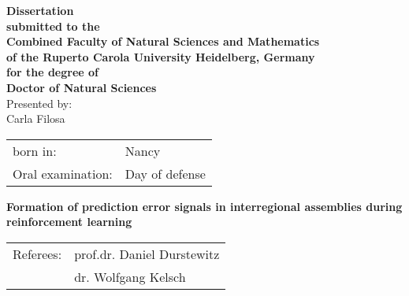 \thispagestyle{empty}

\vspace*{1cm}

\begin{center}
{\textbf{Dissertation\\submitted to the\\Combined Faculty of Natural Sciences and Mathematics\\of the Ruperto Carola University Heidelberg, Germany\\for the degree of\\Doctor of Natural Sciences}}\\
\vspace{10cm}
Presented by:\\ Carla Filosa\\
\vspace{1cm}
\begin{tabular}{ll}
born in: & Nancy \\
Oral examination: &  Day of defense \\
\end{tabular}
\end{center}
\clearpage
\thispagestyle{empty}

\begin{center}
\vspace*{3cm}
{\Huge \textbf{Formation of prediction error signals in interregional assemblies during reinforcement learning}}

\vspace*{12cm}

\begin{tabular}{ll}
Referees: & prof.dr. Daniel Durstewitz \\
&  dr. Wolfgang Kelsch \\
\end{tabular}
\end{center}
\afterpage{\blankpage}



